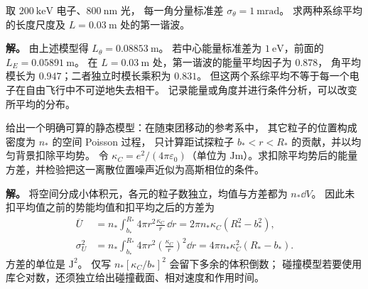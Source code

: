 \begin{exbox}[能量涨落与角涨落的长度比较]
取 $\SI{200}{\kilo\electronvolt}$ 电子、$\SI{800}{\nano\metre}$ 光，
每一角分量标准差 $\sigma_\theta=\SI{1}{\milli\radian}$。
求两种系综平均的长度尺度及 $L=\SI{0.03}{\metre}$ 处的第一谐波。

\textbf{解。}
由上述模型得 $L_\theta=\SI{0.08853}{\metre}$。
若中心能量标准差为 $\SI{1}{\electronvolt}$，前面的 $L_E=\SI{0.05891}{\metre}$。
在 $L=\SI{0.03}{\metre}$ 处，第一谐波的能量平均因子为 $0.878$，
角平均模长为 $0.947$；二者独立时模长乘积为 $0.831$。
但这两个系综平均不等于每一个电子在自由飞行中不可逆地失去相干。
记录能量或角度并进行条件分析，可以改变所平均的分布。
\end{exbox}

\begin{exbox}[静态库仑涨落必须包含空间积分]
给出一个明确可算的静态模型：在随束团移动的参考系中，
其它粒子的位置构成密度为 $n_*$ 的空间 Poisson 过程，
只计算距试探粒子 $b_*<r<R_*$ 的贡献，并以均匀背景扣除平均势。
令 $\kappa_C=e^2/(4\pi\varepsilon_0)$（单位为 $\si{\joule\metre}$）。求扣除平均势后的能量方差，并检验把这一离散位置噪声近似为高斯相位的条件。

\textbf{解。}
将空间分成小体积元，各元的粒子数独立，均值与方差都为 $n_*\dd V$。
因此未扣平均值之前的势能均值和扣平均之后的方差为
\begin{align}
\overline U&=n_*\int_{b_*}^{R_*}4\pi r^2\frac{\kappa_C}{r}\,\dd r
=2\pi n_*\kappa_C(R_*^2-b_*^2),\label{eq:feqo-mean-coulomb}\\
\sigma_U^2&=n_*\int_{b_*}^{R_*}4\pi r^2
\left(\frac{\kappa_C}{r}\right)^2\dd r
=4\pi n_*\kappa_C^2(R_*-b_*).
\label{eq:feqo-coulomb-energy-spread}
\end{align}
方差的单位是 $\si{\joule\squared}$。
仅写 $n_*[\kappa_C/b_*]^2$ 会留下多余的体积倒数；
碰撞模型若要使用库仑对数，还须独立给出碰撞截面、相对速度和作用时间。


\end{exbox}
